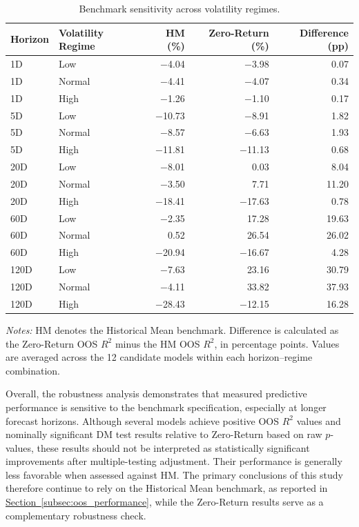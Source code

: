 \documentclass[runningheads,orivec]{llncs}
\begin{document}
\begin{table}[htbp]
\centering
\caption{Benchmark sensitivity across volatility regimes.}\label{tab:benchmark_regimes}
{\small
\setlength{\tabcolsep}{7pt}
\begin{tabular}{llrrr}
\hline
Horizon & Volatility Regime & HM (\%) & Zero-Return (\%) & Difference (pp) \\
\hline
1D   & Low    & $-$4.04  & $-$3.98  &  0.07 \\
1D   & Normal & $-$4.41  & $-$4.07  &  0.34 \\
1D   & High   & $-$1.26  & $-$1.10  &  0.17 \\
\hline
5D   & Low    & $-$10.73 & $-$8.91  &  1.82 \\
5D   & Normal & $-$8.57  & $-$6.63  &  1.93 \\
5D   & High   & $-$11.81 & $-$11.13 &  0.68 \\
\hline
20D  & Low    & $-$8.01  &  0.03  &  8.04 \\
20D  & Normal & $-$3.50  &  7.71  & 11.20 \\
20D  & High   & $-$18.41 & $-$17.63 &  0.78 \\
\hline
60D  & Low    & $-$2.35  & 17.28  & 19.63 \\
60D  & Normal &  0.52  & 26.54  & 26.02 \\
60D  & High   & $-$20.94 & $-$16.67 &  4.28 \\
\hline
120D & Low    & $-$7.63  & 23.16  & 30.79 \\
120D & Normal & $-$4.11  & 33.82  & 37.93 \\
120D & High   & $-$28.43 & $-$12.15 & 16.28 \\
\hline
\end{tabular}}
\par\vspace{4pt}\parbox{\linewidth}{\linespread{1.2}\selectfont\footnotesize\textit{Notes:} HM denotes the Historical Mean benchmark. Difference is calculated as the Zero-Return OOS $R^2$ minus the HM OOS $R^2$, in percentage points. Values are averaged across the 12 candidate models within each horizon--regime combination.\par}
\end{table}

Overall, the robustness analysis demonstrates that measured predictive performance is sensitive to the benchmark specification, especially at longer forecast horizons. Although several models achieve positive OOS $R^2$ values and nominally significant DM test results relative to Zero-Return based on raw $p$-values, these results should not be interpreted as statistically significant improvements after multiple-testing adjustment. Their performance is generally less favorable when assessed against HM. The primary conclusions of this study therefore continue to rely on the Historical Mean benchmark, as reported in \hyperref[subsec:oos_performance]{Section~\ref*{subsec:oos_performance}}, while the Zero-Return results serve as a complementary robustness check.
\end{document}
